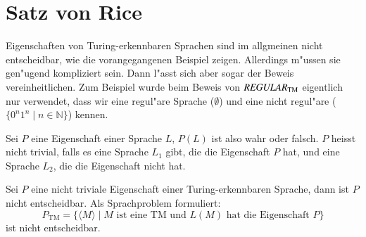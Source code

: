 \section{Satz von Rice}
Eigenschaften von Turing-erkennbaren Sprachen sind im allgmeinen
nicht entscheidbar, wie die vorangegangenen Beispiel zeigen.
Allerdings m"ussen sie gen"u\-gend kompliziert sein. Dann l"asst
sich aber sogar der Beweis vereinheitlichen. Zum Beispiel wurde
beim Beweis von $\text{\it REGULAR}_{\text{TM}}$ eigentlich
nur verwendet, dass wir eine regul"are Sprache ($\emptyset$) und
eine nicht regul"are ($\{0^n1^n\;|\;n\in\mathbb N\}$) kennen.

\begin{definition}
Sei $P$ eine Eigenschaft einer Sprache $L$, $P(L)$ ist also wahr oder
falsch. $P$ heisst nicht trivial, falls es eine Sprache $L_1$ gibt,
die die Eigenschaft $P$ hat, und eine Sprache $L_2$, die die
Eigenschaft nicht hat.
\end{definition}

\begin{satz}[Rice]
\label{rice-theorem}
Sei $P$ eine nicht triviale Eigenschaft einer Turing-erkennbaren Sprache,
dann ist $P$ nicht entscheidbar. Als Sprachproblem formuliert:
\[
P_{\text{TM}}=\{ \langle M\rangle\;|\;
\text{$M$ ist eine TM und $L(M)$ hat die Eigenschaft $P$}
\}
\]
ist nicht entscheidbar.
\end{satz}

